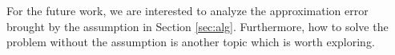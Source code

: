 \documentclass[sigconf,authordraft]{acmart}
\begin{document}
For the future work, we are interested to analyze the approximation error brought by the assumption in Section \ref{sec:alg}. Furthermore, how to solve the problem without the assumption is another topic which is worth exploring. 






\end{document}
